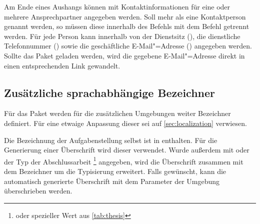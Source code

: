 \begin{Declaration}{}
\begin{Declaration}{}
\begin{Declaration}{}
\begin{Declaration}{}
\printdeclarationlist%
%
Am Ende eines Aushangs können mit  Kontaktinformationen 
für eine oder mehrere Ansprechpartner angegeben werden. Soll mehr als eine 
Kontaktperson genannt werden, so müssen diese innerhalb des Befehls
 mit dem Befehl  getrennt werden. Für jede 
Person kann innerhalb von  der Dienstsitz 
(), die dienstliche Telefonnummer () sowie die 
geschäftliche E-Mail"=Adresse () angegeben werden. Sollte das 
Paket  geladen werden, wird die gegebene E-Mail"=Adresse 
direkt in einen entsprechenden Link gewandelt.
\end{Declaration}
\end{Declaration}
\end{Declaration}
\end{Declaration}


\subsection{Zusätzliche sprachabhängige Bezeichner}
Für das Paket  werden für die zusätzlichen 
Umgebungen weiter Bezeichner definiert. Für eine etwaige Anpassung dieser sei 
auf \autoref{sec:localization} verwiesen.

\begin{Declaration}{}
\begin{Declaration}{}
\printdeclarationlist%
%
Die Bezeichnung der Aufgabenstellung selbst ist in  enthalten. 
Für die Generierung einer Überschrift wird dieser verwendet. Wurde außerdem mit 
 oder  der Typ der Abschlussarbeit%
\footnote{%
   oder spezieller Wert aus \autoref{tab:thesis}
}
angegeben, wird die Überschrift zusammen mit dem Bezeichner 
um die Typisierung erweitert. Falls gewünscht, kann die automatisch generierte 
Überschrift mit dem Parameter  der Umgebung 
 überschrieben werden.
\end{Declaration}
\end{Declaration}

